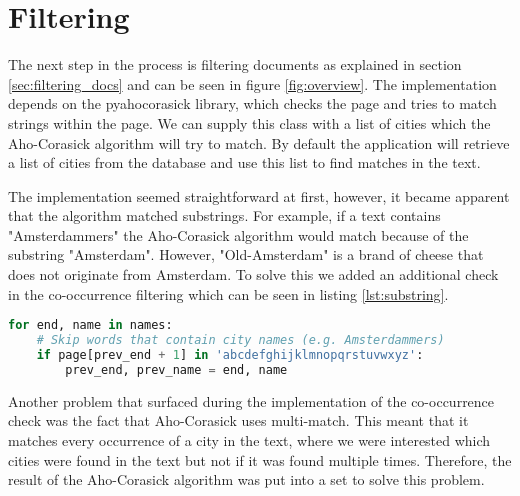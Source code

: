 \section{Filtering}\label{sec:5-filtering}
The next step in the process is filtering documents as explained in section \ref{sec:filtering_docs} and can be seen in figure \ref{fig:overview}. The implementation depends on the pyahocorasick library, which checks the page and tries to match strings within the page. We can supply this class with a list of cities which the Aho-Corasick algorithm will try to match. By default the application will retrieve a list of cities from the database and use this list to find matches in the text.

The implementation seemed straightforward at first, however, it became apparent that the algorithm matched substrings. For example, if a text contains "Amsterdammers" the Aho-Corasick algorithm would match because of the substring "Amsterdam". However, "Old-Amsterdam" is a brand of cheese that does not originate from Amsterdam. To solve this we added an additional check in the co-occurrence filtering which can be seen in listing \ref{lst:substring}.

\begin{lstlisting}[language=Python, caption=Additional check to prevent substring matches, label={lst:substring}]
for end, name in names:
    # Skip words that contain city names (e.g. Amsterdammers)
    if page[prev_end + 1] in 'abcdefghijklmnopqrstuvwxyz':
        prev_end, prev_name = end, name
\end{lstlisting}

Another problem that surfaced during the implementation of the co-occurrence check was the fact that Aho-Corasick uses multi-match. This meant that it matches every occurrence of a city in the text, where we were interested which cities were found in the text but not if it was found multiple times. Therefore, the result of the Aho-Corasick algorithm was put into a set to solve this problem.
